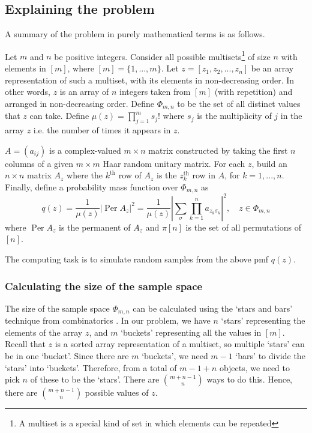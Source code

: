 \documentclass[11pt]{article}
\theoremstyle{theorem}
\theoremstyle{remark}
\theoremstyle{plain}
\theoremstyle{definition}
\DeclareMathOperator*{\Per}{\mathrm{Per}}
\begin{document}
\subsection{Explaining the problem}
A summary of the problem in purely mathematical terms is as follows. 

Let $m$ and $n$ be positive integers. Consider all possible multisets\footnote{A multiset is a special kind of set in which elements can be repeated} of size $n$ with elements in $[m]$, where $[m] = \{1, ... , m\}$. Let $z = [z_1, z_2, ... , z_n]$ be an array representation of such a multiset, with its elements in non-decreasing order. In other words, $z$ is an array of $n$ integers taken from $[m]$ (with repetition) and arranged in non-decreasing order. Define $\Phi_{m,n}$ to be the set of all distinct values that $z$ can take. Define $\mu(z) = \prod_{j=1}^m s_j !$ where $s_j$ is the multiplicity of $j$ in the array $z$ i.e. the number of times it appears in $z$.

$A = (a_{ij})$ is a complex-valued $m \times n$ matrix constructed by taking the first $n$ columns of a given $m \times m$ Haar random unitary matrix. For each $z$, build an $n \times n$ matrix $A_z$ where the $k^{\text{th}}$ row of $A_z$ is the $z_k^{\text{th}}$ row in $A$, for $k = 1, ... , n$. Finally, define a probability mass function over $\Phi_{m,n}$  as
\begin{equation}\label{boson_sampling_formula1}
q (z) = \frac{1}{\mu(z)} \left|\Per A_z \right| ^2 = \frac{1}{\mu(z)}  \left|\sum_{\sigma} \prod_{k=1}^n a_{z_k \sigma_k}\right|^2, \quad z \in \Phi_{m,n}
\end{equation}
where $\Per A_z$ is the permanent of $A_z$ and $\pi[n]$ is the set of all permutations of $[n]$.

The computing task is to simulate random samples from the above pmf $q(z)$.
\subsubsection{Calculating the size of the sample space}
The size of the sample space $ \Phi_{m,n}$ can be calculated using the `stars and bars' technique from combinatorics \cite{feller1968}. In our problem, we have $n$ `stars' representing the elements of the array $z$, and $m$ `buckets' representing all the values in $[m]$. Recall that $z$ is a sorted array representation of a multiset, so multiple `stars' can be in one `bucket'. Since there are $m$ `buckets', we need $m-1$ `bars' to divide the `stars' into `buckets'. Therefore, from a total of $m-1 + n$ objects, we need to pick $n$ of these to be the `stars'. There are $\binom{m+n-1}{n}$ ways to do this. Hence, there are $\binom{m+n-1}{n}$ possible values of $z$.
\end{document}
